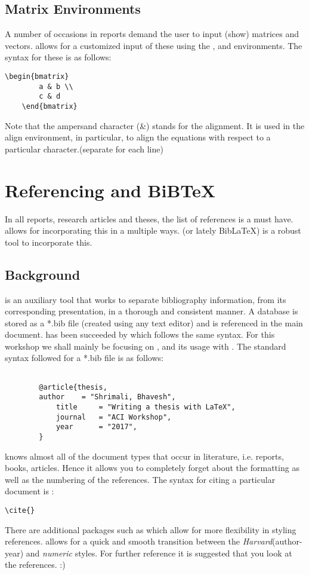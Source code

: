 \section{Matrix Environments}
A number of occasions in reports demand the user to input (show) matrices and vectors. \latex allows for a customized input of these using the ,  and  environments. The syntax for these is as follows: 
\begin{lstlisting}[frame=single]
	\begin{bmatrix}
		a & b \\
		c & d
	\end{bmatrix}
\end{lstlisting}
Note that the ampersand character (\&) stands for the alignment. It is used in the align environment, in particular, to align the equations with respect to a particular character.(separate for each line)
\chapter{Referencing and BiBTeX}
In all reports, research articles and theses, the list of references is a must have. \latex allows for incorporating this in a multiple ways. \bibtex (or lately BibLaTeX) is a robust tool to incorporate this.
\section{Background}
\bibtex is an auxiliary tool that works to separate bibliography information, from its corresponding presentation, in a thorough and consistent manner. A \bibtex database is stored as a *.bib file (created using any text editor) and is referenced in the main \tex document. \bibtex has been succeeded by \biblatex which follows the same syntax. For this workshop we shall mainly be focusing on \bibtex, and its usage with \latex. The standard syntax followed for a *.bib file is as follows: 
\begin{lstlisting}[frame=single]
		
		@article{thesis,
   		author    = "Shrimali, Bhavesh",
    		title     = "Writing a thesis with LaTeX",
    		journal   = "ACI Workshop",
    		year      = "2017",
		}
\end{lstlisting}
\bibtex knows almost all of the document types that occur in literature, i.e. reports, books, articles. Hence it allows you to completely forget about the formatting as well as the numbering of the references. The syntax for citing a particular document is : 
\begin{lstlisting}[frame=single]
		\cite{}
\end{lstlisting}
There are additional packages such as  which allow for more flexibility in styling  references.  allows for a quick and smooth transition between the \emph{Harvard}(author-year) and \emph{numeric} styles. For further reference it is suggested that you look at the references. :)
